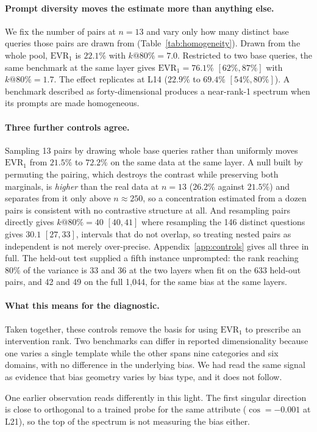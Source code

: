 \paragraph{Prompt diversity moves the estimate more than anything else.}
We fix the number of pairs at $n{=}13$ and vary only how many distinct base
queries those pairs are drawn from (Table~\ref{tab:homogeneity}). Drawn from
the whole pool, $\mathrm{EVR}_1$ is $22.1\%$ with $k@80\%{=}7.0$. Restricted
to two base queries, the same benchmark at the same layer gives
$\mathrm{EVR}_1{=}76.1\%$ $[62\%, 87\%]$ with $k@80\%{=}1.7$. The effect
replicates at L14 ($22.9\%$ to $69.4\%$ $[54\%, 80\%]$). A benchmark
described as forty-dimensional produces a near-rank-1 spectrum when its
prompts are made homogeneous.

\paragraph{Three further controls agree.} Sampling 13 pairs by drawing whole base
queries rather than uniformly moves $\mathrm{EVR}_1$ from $21.5\%$ to $72.2\%$ on the
same data at the same layer. A null built by permuting the pairing, which destroys the
contrast while preserving both marginals, is \emph{higher} than the real data at
$n{=}13$ ($26.2\%$ against $21.5\%$) and separates from it only above $n \approx 250$,
so a concentration estimated from a dozen pairs is consistent with no contrastive
structure at all. And resampling pairs directly gives $k@80\%{=}40$ $[40, 41]$ where
resampling the 146 distinct questions gives $30.1$ $[27, 33]$, intervals that do not
overlap, so treating nested pairs as independent is not merely over-precise.
Appendix~\ref{app:controls} gives all three in full. The held-out test supplied a fifth
instance unprompted: the rank reaching $80\%$ of the variance is 33 and 36 at the two
layers when fit on the 633 held-out pairs, and 42 and 49 on the full 1{,}044, for the
same bias at the same layers.

\paragraph{What this means for the diagnostic.} Taken together, these
controls remove the basis for using $\mathrm{EVR}_1$ to prescribe an
intervention rank. Two benchmarks can differ in reported dimensionality
because one varies a single template while the other spans nine categories
and six domains, with no difference in the underlying bias. We had read the
same signal as evidence that bias geometry varies by bias type, and it does
not follow.

One earlier observation reads differently in this light. The first singular direction is
close to orthogonal to a trained probe for the same attribute ($\cos{=}{-}0.001$ at L21),
so the top of the spectrum is not measuring the bias either.
